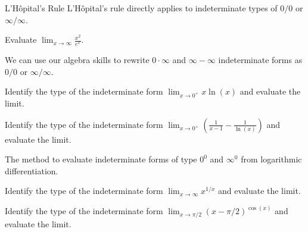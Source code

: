 \documentclass[../main.tex]{subfiles}
\begin{document}
\begin{lesson}{L'H\^opital's Rule}
  L'H\^opital's rule directly applies to indeterminate types of \(0/0\) or \(\infty/\infty\).
  \begin{example}
    Evaluate \(\lim_{x \to \infty} \frac{x^{2}}{e^{x}}\).
  \end{example}

  
  \clearpage

  We can use our algebra skills to rewrite \(0 \cdot \infty\) and \(\infty - \infty\) indeterminate forms as \(0/0\) or \(\infty/\infty\).
  \begin{example}
    Identify the type of the indeterminate form  \(\lim_{x \to 0^{+}} x \ln(x)\) and evaluate the limit.
  \end{example}

  \begin{example}
    Identify the type of the indeterminate form  \(\lim_{x \to 0^{+}} \left(\frac{1}{x-1} - \frac{1}{\ln(x)}\right)\) and evaluate the limit.
  \end{example}

  The method to evaluate indeterminate forms of type \(0^{0}\) and \(\infty^{0}\)  from logarithmic differentiation.
  \begin{example}
    Identify the type of the indeterminate form \(\lim_{x \to \infty} x^{1/x}\) and evaluate the limit.
  \end{example}
  \clearpage

  \begin{example}
      Identify the type of the indeterminate form \(\lim_{x \to \pi/2} (x - \pi/2)^{\cos(x)}\) and evaluate the limit.
  \end{example}
\end{lesson}
\end{document}
